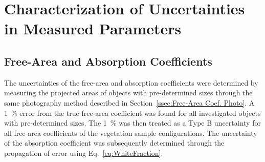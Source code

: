 \documentclass[12pt]{article}
\begin{document}

\appendix
{}
\makeatletter
\newcommand{\section@cntformat}{Appendix:\ }
\makeatother
\section{Characterization of Uncertainties in Measured Parameters} \label{sec:Uncertainty}

\subsection{ Free-Area and Absorption Coefficients }\label{ssec:FAACUncertainty}
The uncertainties of the free-area and absorption coefficients were determined by measuring the projected areas of objects with pre-determined sizes through the same photography method described in Section~\ref{ssec:Free-Area Coef. Photo}. A 1~\% error from the true free-area coefficient was found for all investigated objects with pre-determined sizes. The 1~\% was then treated as a Type B uncertainty for all free-area coefficients of the vegetation sample configurations. The uncertainty of the absorption coefficient was subsequently determined through the propagation of error using Eq.~\ref{eq:WhiteFraction}.
\end{document}
